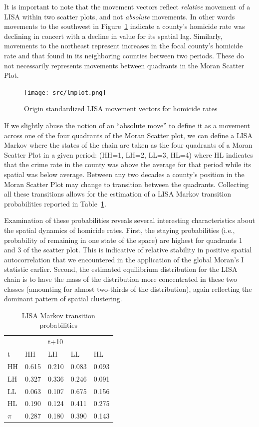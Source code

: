 \documentclass[11pt, titlepage]{article}
\begin{document}
It is important to note that the movement vectors reflect
\emph{relative} movement of a LISA within two scatter plots, and not
\emph{absolute} movements.  In other words movements to the southwest in
Figure~\ref{f:lmplot} indicate a county's homicide rate was declining in
concert with a decline in value for its spatial lag. Similarly,
movements to the northeast represent increases in the focal county's
homicide rate and that found in its neighboring counties between two
periods. These do not necessarily represents movements between quadrants
in the Moran Scatter Plot.


\begin{figure}[ht]
\begin{center}
\texttt{[image: src/lmplot.png]}
\end{center}
\caption{Origin standardized LISA movement vectors for homicide rates}
\label{f:lmplot}
\end{figure}   

If we slightly abuse the notion of an ``absolute move'' to define it as a
movement across one of the four quadrants of the Moran Scatter plot, we
can define a LISA Markov  where the states of the chain
are taken as the four quadrants of a Moran Scatter Plot in a given
period: (HH=1, LH=2, LL=3, HL=4) where HL indicates that the crime rate
in the county was above the average for that period while its spatial
was below average.  Between any two decades a county's position in the
Moran Scatter Plot may change to transition between the quadrants.
Collecting all these transitions allows for the estimation of a LISA
Markov transition probabilities reported in Table~\ref{t:lm}. 

Examination of these probabilities reveals several
interesting characteristics about the spatial dynamics of homicide rates.
First, the staying probabilities (i.e., probability of remaining in one
state of the space) are highest for quadrants 1 and 3 of the scatter
plot. This is indicative of relative stability in positive spatial
autocorrelation that we encountered in the application of the global
Moran's I statistic earlier. Second, the estimated equilibrium
distribution for the LISA chain is to have the mass of the distribution
more concentrated in these two classes (amounting for almost two-thirds
of the distribution), again reflecting the dominant pattern of spatial
clustering.

\begin{table}
  \centering
  \small
\begin{tabular}{|l|llll|}\hline
  & &t+10 & &\\
  t&HH&LH&LL&HL\\
  \hline
HH&0.615 &0.210 &0.083 &0.093\\
LH&0.327 &0.336 &0.246 &0.091\\
LL&0.063 &0.107 &0.675 &0.156\\
HL&0.190 &0.124 &0.411 &0.275\\
\hline
$\pi$&0.287 &0.180 &0.390 &0.143\\
\hline
\end{tabular}
\caption{LISA Markov transition probabilities}
\label{t:lm}
\end{table}
\end{document}
